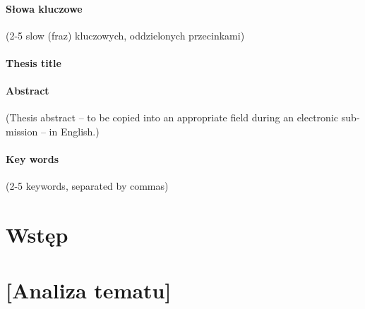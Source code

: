 \subsubsection*{Słowa kluczowe} 
(2-5 slow (fraz) kluczowych, oddzielonych przecinkami)

\subsubsection*{Thesis title} 
\begin{otherlanguage}{british}
\TitleAlt
\end{otherlanguage}

\subsubsection*{Abstract} 
\begin{otherlanguage}{british}
(Thesis abstract – to be copied into an appropriate field during an electronic submission – in English.)
\end{otherlanguage}
\subsubsection*{Key words}  
\begin{otherlanguage}{british}
(2-5 keywords, separated by commas)
\end{otherlanguage}

\tableofcontents

\setcounter{stronyPozaNumeracja}{\value{page}}
\mainmatter
\pagestyle{empty}

\cleardoublepage

\pagestyle{NumeryStronNazwyRozdzialow}


\chapter{Wstęp}


\chapter{[Analiza tematu]}


